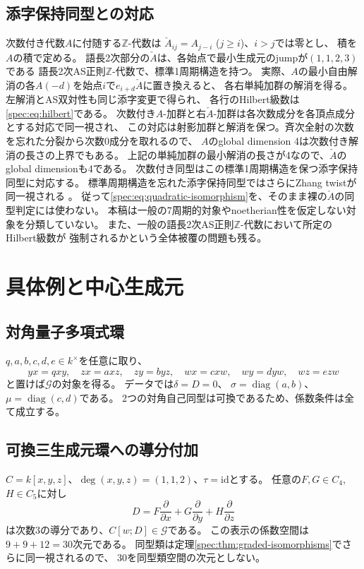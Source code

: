 \documentclass[11pt,a4paper]{ltjsarticle}
\theoremstyle{definition}
\newcommand{\Gclass}{\mathcal G}
\newcommand{\ZZ}{\mathbb Z}
\begin{document}
\subsection{添字保持同型との対応}
次数付き代数$A$に付随する$\ZZ$-代数は
$\check A_{ij}=A_{j-i}$ ($j\geq i$)、$i>j$では零とし、
積を$A$の積で定める。
語長2次部分の$\check A$は、各始点で最小生成元のjumpが$(1,1,2,3)$である
語長2次AS正則$\ZZ$-代数で、標準1周期構造を持つ。
実際、$A$の最小自由解消の各$A(-d)$を始点$i$で$e_{i+d}\check A$に置き換えると、
各右単純加群の解消を得る。左解消とAS双対性も同じ添字変更で得られ、
各行のHilbert級数は\eqref{spec:eq:hilbert}である。
次数付き$A$-加群と右$\check A$-加群は各次数成分を各頂点成分とする対応で同一視され、
この対応は射影加群と解消を保つ。斉次全射の次数を忘れた分裂から次数0成分を取れるので、
$A$のglobal dimension 4は次数付き解消の長さの上界でもある。
上記の単純加群の最小解消の長さが4なので、$\check A$のglobal dimensionも4である。
次数付き同型はこの標準1周期構造を保つ添字保持同型に対応する。
標準周期構造を忘れた添字保持同型ではさらにZhang twistが同一視される
\cite[Theorem~1.2]{Sierra}。
従って\eqref{spec:eq:quadratic-isomorphism}を、そのまま裸の$\check A$の同型判定には使わない。
本稿は一般の7周期的対象やnoetherian性を仮定しない対象を分類していない。
また、一般の語長2次AS正則$\ZZ$-代数において所定のHilbert級数が
強制されるかという全体被覆の問題も残る。

\section{具体例と中心生成元}
\subsection{対角量子多項式環}
$q,a,b,c,d,e\in k^\times$を任意に取り、
\[
yx=qxy,\quad zx=axz,\quad zy=byz,\quad
wx=cxw,\quad wy=dyw,\quad wz=ezw
\]
と置けば$\Gclass$の対象を得る。
データでは$\delta=D=0$、
$\sigma=\operatorname{diag}(a,b)$、
$\mu=\operatorname{diag}(c,d)$である。
2つの対角自己同型は可換であるため、係数条件は全て成立する。

\subsection{可換三生成元環への導分付加}
$C=k[x,y,z]$、$\deg(x,y,z)=(1,1,2)$、$\tau=\mathrm{id}$とする。
任意の$F,G\in C_4$, $H\in C_5$に対し
\[
D=F\frac{\partial}{\partial x}
 +G\frac{\partial}{\partial y}
 +H\frac{\partial}{\partial z}
\]
は次数3の導分であり、$C[w;D]\in\Gclass$である。
この表示の係数空間は$9+9+12=30$次元である。
同型類は定理\ref{spec:thm:graded-isomorphisms}でさらに同一視されるので、
30を同型類空間の次元としない。
\end{document}
